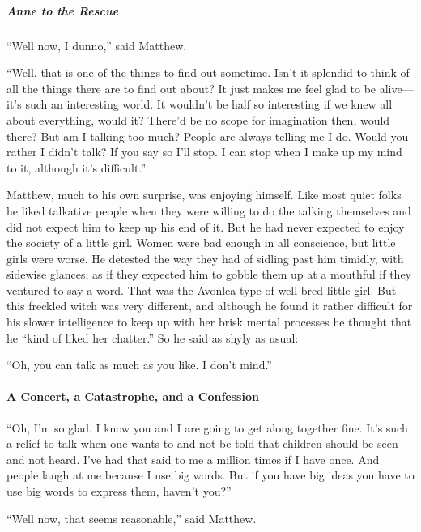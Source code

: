 \documentclass{article}
\begin{document}
\subparagraph{Anne to the Rescue}
``Well now, I dunno,'' said Matthew.

``Well, that is one of the things to find out sometime. Isn't it splendid to think of all the things there are to find out about? It just makes me feel glad to be alive---it's such an interesting world. It wouldn't be half so interesting if we knew all about everything, would it? There'd be no scope for imagination then, would there? But am I talking too much? People are always telling me I do. Would you rather I didn't talk? If you say so I'll stop. I can stop when I make up my mind to it, although it's difficult.''

Matthew, much to his own surprise, was enjoying himself. Like most quiet folks he liked talkative people when they were willing to do the talking themselves and did not expect him to keep up his end of it. But he had never expected to enjoy the society of a little girl. Women were bad enough in all conscience, but little girls were worse. He detested the way they had of sidling past him timidly, with sidewise glances, as if they expected him to gobble them up at a mouthful if they ventured to say a word. That was the Avonlea type of well-bred little girl. But this freckled witch was very different, and although he found it rather difficult for his slower intelligence to keep up with her brisk mental processes he thought that he ``kind of liked her chatter.'' So he said as shyly as usual:

``Oh, you can talk as much as you like. I don't mind.''

\paragraph{A Concert, a Catastrophe, and a Confession}
``Oh, I'm so glad. I know you and I are going to get along together fine. It's such a relief to talk when one wants to and not be told that children should be seen and not heard. I've had that said to me a million times if I have once. And people laugh at me because I use big words. But if you have big ideas you have to use big words to express them, haven't you?''

``Well now, that seems reasonable,'' said Matthew.
\end{document}
